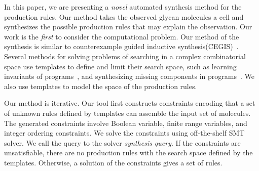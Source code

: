 In this paper, we are presenting a {\em novel} automated synthesis
method for the production rules.
Our method takes the observed glycan molecules a cell and synthesizes
the possible production rules that may explain the observation.
Our work is the {\em first} to consider the computational problem.
Our method of the synthesis is similar to counterexample guided
inductive synthesis(CEGIS)~\cite{cegis}.
Several methods for solving problems of searching in a complex combinatorial
space use templates to define and limit their search space,
such as learning invariants of programs~\cite{InvGenTACAS09},
and synthesizing missing components in programs~\cite{sygus,Solar-Lezama2005}.
We also use templates to model the space of the production rules.


Our method is iterative.
Our tool first constructs constraints encoding that a set of unknown rules
defined by templates can assemble the input set of molecules.
The generated constraints involve Boolean variable, finite range variables, and integer ordering
constraints.
We solve the constraints using off-the-shelf SMT solver.
We call the query to the solver {\em synthesis query}.
If the constraints are unsatisfiable, there are no production rules with the search space
defined by the templates.
Otherwise, a solution of the constraints gives a set of rules.

